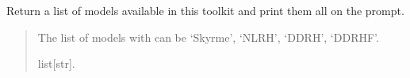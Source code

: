 \documentclass[letterpaper,10pt,english]{sphinxmanual}
\begin{document}

\begin{fulllineitems}
\label{\detokenize{source/api/setup_eos_pheno:nucleardatapy.setup_eos_pheno.eos_pheno_models}}
\pysigstartsignatures
\pysiglinewithargsret
{}
{}
{}
\pysigstopsignatures
\sphinxAtStartPar
Return a list of models available in this toolkit and print them all on the prompt.
\begin{quote}\begin{description}
\sphinxAtStartPar
The list of models with can be ‘Skyrme’, ‘NLRH’, ‘DDRH’, ‘DDRHF’.

\sphinxAtStartPar
list{[}str{]}.

\end{description}\end{quote}

\end{fulllineitems}

\end{document}

